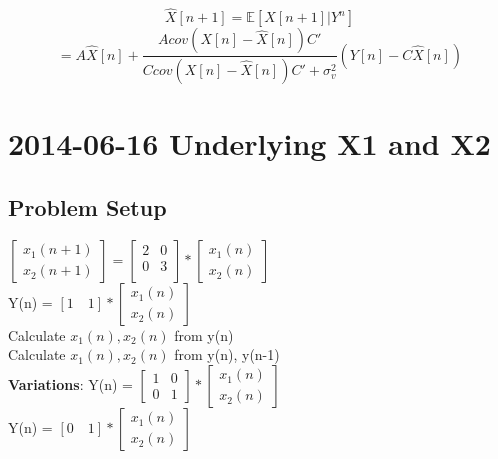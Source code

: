 \documentclass[leqno,twocolumn]{article}
\begin{document}
\[\hat{X}[n+1] = \mathbb{E}[X[n+1]|Y^n]\]
\[\boxed{ = A\hat{X}[n] + \frac{Acov(X[n]-\hat{X}[n])C'}{Ccov(X[n]-\hat{X}[n])C'+\sigma_v^2}\left(Y[n]-C\hat{X}[n]\right) } \]

\section{2014-06-16 Underlying X1 and X2}
\subsection{Problem Setup}
$\left[\begin{matrix}
x_1(n+1)\\
x_2(n+1) 
\end{matrix}\right] = \left[\begin{matrix}
2 & 0\\
0 & 3\\
\end{matrix}\right] * \left[\begin{matrix}
x_1(n)\\
x_2(n)
\end{matrix}\right]$\\
Y(n) = $[1 \quad 1] * \left[ \begin{matrix}
x_1(n)\\ x_2(n)
\end{matrix} \right] $\\
Calculate $x_1(n), x_2(n)$ from y(n)\\
Calculate $x_1(n), x_2(n)$ from y(n), y(n-1)\\

\textbf{Variations}:
Y(n) = $\left[ \begin{matrix}
1 & 0\\ 0 & 1
\end{matrix}\right] * \left[ \begin{matrix}
x_1(n) \\ x_2(n)
\end{matrix} \right] $\\
Y(n) = $[0 \quad 1] * \left[ \begin{matrix}
x_1(n) \\ x_2(n)
\end{matrix} \right] $
\end{document}
